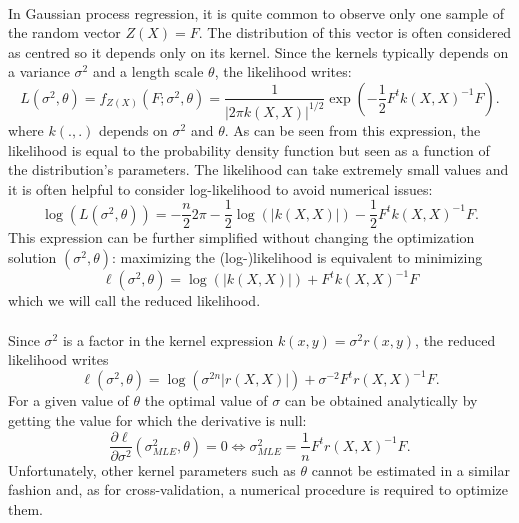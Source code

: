 \documentclass[twoside,openright]{report}
\begin{document}
\paragraph{}
In Gaussian process regression, it is quite common to observe only one sample of the random vector $Z(X)=F$. The distribution of this vector is often considered as centred so it depends only on its kernel. Since the kernels typically depends on a variance $\sigma^2$ and a length scale $\theta$, the likelihood writes:
\begin{equation}
 	L(\sigma^2, \theta) = f_{Z(X)}(F ; \sigma^2, \theta) = \frac{1}{\displaystyle | 2 \pi k(X,X)|^{1/2}} \exp \left(-\frac12 F^t k(X,X)^{-1} F  \right).
\end{equation} 
where $k(.,.)$ depends on $\sigma^2$ and $\theta$. As can be seen from this expression, the likelihood is equal to the probability density function but seen as a function of the distribution's parameters. The likelihood can take extremely small values and it is often helpful to consider log-likelihood to avoid numerical issues:
\begin{equation}
 	\log (L (\sigma^2, \theta)) = - \frac{n}{2} 2 \pi - \frac{1}{2}  \log(|k(X,X)|) -\frac12 F^t k(X,X)^{-1} F .
\end{equation} 
This expression can be further simplified without changing the optimization solution $(\sigma^2, \theta)$: maximizing the (log-)likelihood is equivalent to minimizing
\begin{equation}
 	\ell (\sigma^2, \theta) =  \log(|k(X,X)|) + F^t k(X,X)^{-1} F
\end{equation} 
which we will call the reduced likelihood.

\paragraph{}
Since $\sigma^2$ is a factor in the kernel expression $k(x,y)=\sigma^2 r(x,y)$, the reduced likelihood writes
\begin{equation}
 	\ell (\sigma^2, \theta) =  \log(\sigma^{2n} |r(X,X)|) + \sigma^{-2} F^t r(X,X)^{-1} F.
\end{equation} 
For a given value of $\theta$ the optimal value of $\sigma$ can be obtained analytically by getting the value for which the derivative is null:
\begin{equation}
 	 \frac{\partial \ell}{\partial \sigma^2} (\sigma^2_{MLE}, \theta) = 0 \Leftrightarrow \sigma^2_{MLE} = \frac1n F^t r(X,X)^{-1} F.
\end{equation} 
Unfortunately, other kernel parameters such as $\theta$ cannot be estimated in a similar fashion and, as for cross-validation, a numerical procedure is required to optimize them.
\end{document}
